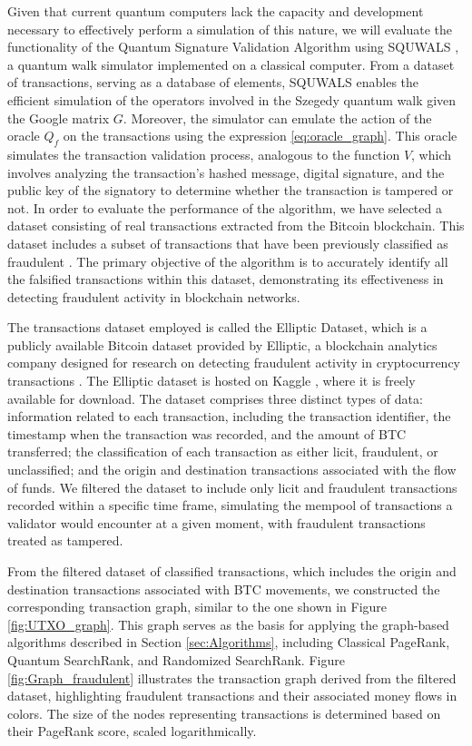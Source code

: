 \documentclass[nofootinbib,aps,prd,reprint,superscriptaddress,floatfix]{revtex4-2}
\begin{document}
Given that current quantum computers lack the capacity and development necessary to effectively perform a simulation of this nature, we will evaluate the functionality of the Quantum Signature Validation Algorithm using SQUWALS \cite{Squwals}, a quantum walk simulator implemented on a classical computer. From a dataset of transactions, serving as a database of elements, SQUWALS enables the efficient simulation of the operators involved in the Szegedy quantum walk given the Google matrix $G$. Moreover, the simulator can emulate the action of the oracle $Q_f$ on the transactions using the expression \eqref{eq:oracle_graph}. This oracle simulates the transaction validation process, analogous to the function $V$, which involves analyzing the transaction's hashed message, digital signature, and the public key of the signatory to determine whether the transaction is tampered or not. In order to evaluate the performance of the algorithm, we have selected a dataset consisting of real transactions extracted from the Bitcoin blockchain. This dataset includes a subset of transactions that have been previously classified as fraudulent \cite{Kaggle}. The primary objective of the algorithm is to accurately identify all the falsified transactions within this dataset, demonstrating its effectiveness in detecting fraudulent activity in blockchain networks. 

The transactions dataset employed is called the Elliptic Dataset, which is a publicly available Bitcoin dataset provided by Elliptic, a blockchain analytics company designed for research on detecting fraudulent activity in cryptocurrency transactions \cite{Elliptic}. The Elliptic dataset is hosted on Kaggle \cite{Kaggle}, where it is freely available for download. The dataset comprises three distinct types of data: information related to each transaction, including the transaction identifier, the timestamp when the transaction was recorded, and the amount of BTC transferred; the classification of each transaction as either licit, fraudulent, or unclassified; and the origin and destination transactions associated with the flow of funds. We filtered the dataset to include only licit and fraudulent transactions recorded within a specific time frame, simulating the mempool of transactions a validator would encounter at a given moment, with fraudulent transactions treated as tampered. 

From the filtered dataset of classified transactions, which includes the origin and destination transactions associated with BTC movements, we constructed the corresponding transaction graph, similar to the one shown in Figure \ref{fig:UTXO_graph}. This graph serves as the basis for applying the graph-based algorithms described in Section \ref{sec:Algorithms}, including Classical PageRank, Quantum SearchRank, and Randomized SearchRank. Figure \ref{fig:Graph_fraudulent} illustrates the transaction graph derived from the filtered dataset, highlighting fraudulent transactions and their associated money flows in colors. The size of the nodes representing transactions is determined based on their PageRank score, scaled logarithmically. 
\end{document}
